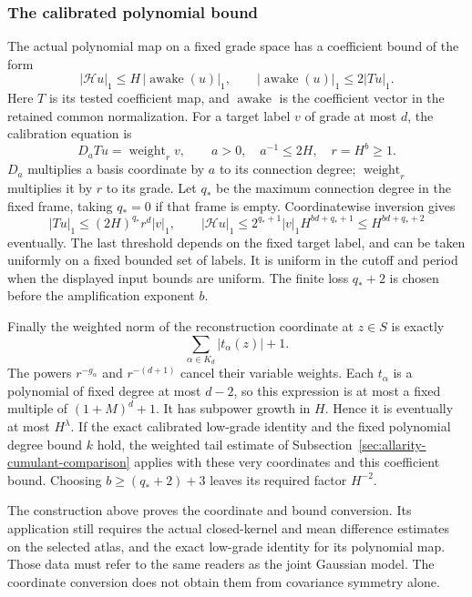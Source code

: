 \subsubsection{The calibrated polynomial bound}

The actual polynomial map on a fixed grade space has a coefficient
bound of the form
\[
 |\mathcal H u|_1\le H\,|\operatorname{awake}(u)|_1,
 \qquad |\operatorname{awake}(u)|_1\le2|Tu|_1.
\]
Here $T$ is its tested coefficient map, and $\operatorname{awake}$
is the coefficient vector in the retained common normalization.
For a target label $v$ of grade at most $d$, the calibration equation
is
\[
                D_aTu=\operatorname{weight}_r v,
        \qquad a>0,\quad a^{-1}\le2H,\quad r=H^b\ge1.
\]
$D_a$ multiplies a basis coordinate by $a$ to its connection degree;
$\operatorname{weight}_r$ multiplies it by $r$ to its grade.
Let $q_*$ be the maximum connection degree in the fixed frame, taking
$q_*=0$ if that frame is empty. Coordinatewise inversion gives
\[
 |Tu|_1\le(2H)^{q_*}r^d|v|_1,
 \qquad |\mathcal H u|_1
          \le2^{q_*+1}|v|_1H^{bd+q_*+1}
          \le H^{bd+q_*+2}
\]
eventually. The last threshold depends on the fixed target label,
and can be taken uniformly on a fixed bounded set of labels.
It is uniform in the cutoff and period when the displayed input
bounds are uniform. The finite loss $q_*+2$ is chosen before the
amplification exponent $b$.

Finally the weighted norm of the reconstruction coordinate at
$z\in S$ is exactly
\[
       \sum_{\alpha\in K_d}|t_\alpha(z)|+1.
\]
The powers $r^{-g_\alpha}$ and $r^{-(d+1)}$ cancel their variable
weights. Each $t_\alpha$ is a polynomial of fixed degree at most
$d-2$, so this expression is at most a fixed multiple of
$(1+M)^d+1$. It has subpower growth in $H$. Hence it is eventually
at most $H^\lambda$. If the exact calibrated low-grade identity
and the fixed polynomial degree bound $k$ hold, the weighted tail
estimate of Subsection~\ref{sec:allarity-cumulant-comparison} applies
with these very coordinates and this coefficient bound. Choosing
$b\ge(q_*+2)+3$ leaves its required factor $H^{-2}$.

The construction above proves the coordinate and bound conversion.
Its application still requires the actual closed-kernel and mean
difference estimates on the selected atlas, and the exact low-grade
identity for its polynomial map. Those data must refer to the same
readers as the joint Gaussian model. The coordinate conversion
does not obtain them from covariance symmetry alone.
